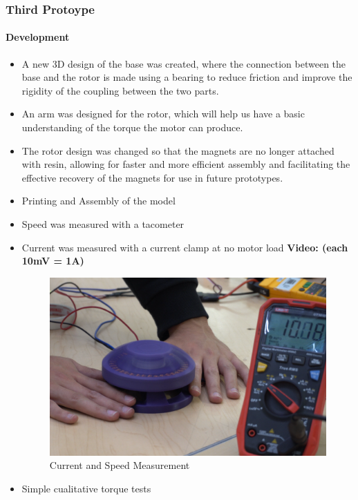 \documentclass{article}
\begin{document}
\subsubsection{Third Protoype}


\paragraph[short]{Development}
\begin{itemize}
    \item A new 3D design of the base was created, where the connection between the base and the rotor is made using a bearing to reduce friction and improve the rigidity of the coupling between the two parts.
    \item An arm was designed for the rotor, which will help us have a basic understanding of the torque the motor can produce.
    \item The rotor design was changed so that the magnets are no longer attached with resin, allowing for faster and more efficient assembly and facilitating the effective recovery of the magnets for use in future prototypes.
    \item Printing and Assembly of the model
    \item Speed was measured with a tacometer
    \item Current was measured with a current clamp at no motor load
    \textbf{Video:  (each 10mV = 1A)}
    \begin{figure}[H]
        \centering
        \includegraphics[width=\linewidth]{Images/Motor/CurrentMeasure.png}
        \caption{Current and Speed Measurement}
    \end{figure}
    \item Simple cualitative torque tests
\end{itemize}
\end{document}
